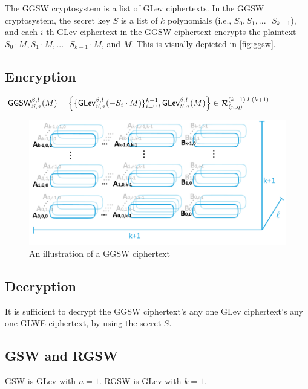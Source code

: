 The GGSW cryptosystem is a list of GLev ciphertexts. In the GGSW cryptosystem, the secret key $S$ is a list of $k$ polynomials (i.e., $S_0, S_1, ... \text{ } S_{k-1}$), and each $i$-th GLev ciphertext in the GGSW ciphertext encrypts the plaintext $S_0 \cdot M, S_1 \cdot M, ... \text{ } S_{k-1} \cdot M$, and $M$. This is visually depicted in \autoref{fig:ggsw}.


\subsection{Encryption}
\label{subsec:ggsw-enc}

\begin{tcolorbox}[title={\textbf{\tboxlabel{\ref*{subsec:ggsw-enc}} GGSW Encryption}}]
$\textsf{GGSW}_{S, \sigma}^{\beta, l}(M) = \Bigl \{ \{ \textsf{GLev}_{S, \sigma}^{\beta, l}(-S_i \cdot M)  \}_{i=0}^{k-1}, \textsf{GLev}_{S, \sigma}^{\beta, l}(M) \Bigr \} \in \mathcal{R}_{\langle n, q \rangle }^{(k+1) \cdot l \cdot (k+1)}$
\end{tcolorbox}

\begin{figure}[h!]
    \centering
  \includegraphics[width=1.0\linewidth]{figures/TFHE-fig3.pdf}
  \caption{An illustration of a GGSW ciphertext}
  \label{fig:ggsw}
\end{figure}


\subsection{Decryption}

It is sufficient to decrypt the GGSW ciphertext's any one GLev ciphertext's any one GLWE ciphertext, by using the secret $S$.



\subsection{GSW and RGSW}

GSW is GLev with $n=1$. RGSW is GLev with $k=1$.